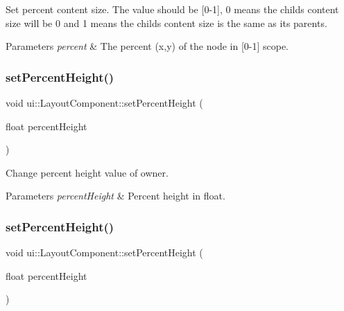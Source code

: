 Set percent content size. The value should be \mbox{[}0-\/1\mbox{]}, 0 means the child\textquotesingle{}s content size will be 0 and 1 means the child\textquotesingle{}s content size is the same as its parents. 
\begin{DoxyParams}{Parameters}
{\em percent} & The percent (x,y) of the node in \mbox{[}0-\/1\mbox{]} scope. \\
\hline
\end{DoxyParams}
\mbox{\label{classui_1_1LayoutComponent_a6533514d789f5edb4c67c11bb7b45770}} 
\subsubsection{\texorpdfstring{set\+Percent\+Height()}{setPercentHeight()}\hspace{0.1cm}{\footnotesize\ttfamily [1/2]}}
{\footnotesize\ttfamily void ui\+::\+Layout\+Component\+::set\+Percent\+Height (\begin{DoxyParamCaption}\item[{float}]{percent\+Height }\end{DoxyParamCaption})}

Change percent height value of owner. 
\begin{DoxyParams}{Parameters}
{\em percent\+Height} & Percent height in float. \\
\hline
\end{DoxyParams}
\mbox{\label{classui_1_1LayoutComponent_a6533514d789f5edb4c67c11bb7b45770}} 
\subsubsection{\texorpdfstring{set\+Percent\+Height()}{setPercentHeight()}\hspace{0.1cm}{\footnotesize\ttfamily [2/2]}}
{\footnotesize\ttfamily void ui\+::\+Layout\+Component\+::set\+Percent\+Height (\begin{DoxyParamCaption}\item[{float}]{percent\+Height }\end{DoxyParamCaption})}

